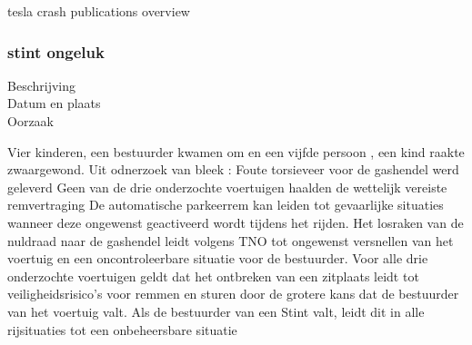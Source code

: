 \cite{globaltimes08052021guangdongcrash}

\cite{anderson30042021secondteslacrash}

\cite{oremus21062017fatalTeslaCrash}

\cite{guardian15052021teslacrashHandsOnWheel}

\cite{Puzzanghera13092017TeslaSharesBlame}

\cite{jaillet02022017teslaAutopilotLimitations}

\cite{reuters03102019teslaAutoParkingFail}

\cite{dowling23042021}

\cite{young05112021fatalTeslaReport}

\cite{kierstein18032021teslaAutopilotCrashStationary}

\cite{janssen20062017teslacrashdetailflorida}







tesla crash publications overview







\subsubsection{stint ongeluk}

\begin{description}
\item[Beschrijving]
\item[Datum en plaats] 
\item[Oorzaak]
\end{description}
Vier kinderen, een bestuurder kwamen om en een vijfde persoon , een kind raakte zwaargewond. Uit odnerzoek van bleek :
Foute torsieveer voor de gashendel werd geleverd
Geen van de drie onderzochte voertuigen haalden de wettelijk vereiste remvertraging
De automatische parkeerrem kan leiden tot gevaarlijke situaties wanneer deze ongewenst geactiveerd wordt tijdens het rijden. 
Het losraken van de nuldraad naar de gashendel leidt volgens TNO tot ongewenst versnellen van het voertuig en een oncontroleerbare situatie voor de bestuurder.
Voor alle drie onderzochte voertuigen geldt dat het ontbreken van een zitplaats leidt tot veiligheidsrisico’s voor remmen en sturen door de grotere kans dat de bestuurder van het voertuig valt. Als de bestuurder van een Stint valt, leidt dit in alle rijsituaties tot een onbeheersbare situatie


